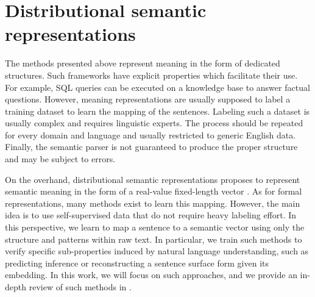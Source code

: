 \section{Distributional semantic representations}

The methods presented above represent meaning in the form of dedicated structures. Such frameworks have explicit properties which facilitate their use. For example, SQL queries can be executed on a knowledge base to answer factual questions. However, meaning representations are usually supposed to label a training dataset to learn the mapping of the sentences. Labeling such a dataset is usually complex and requires linguistic experts. The process should be repeated for every domain and language and usually restricted to generic English data. Finally, the semantic parser is not guaranteed to produce the proper structure and may be subject to errors.

On the overhand, distributional semantic representations proposes to represent semantic meaning in the form of a real-value fixed-length vector \textcite{jurafsky_2009}. As for formal representations, many methods exist to learn this mapping. However, the main idea is to use self-supervised data that do not require heavy labeling effort. In this perspective, we learn to map a sentence to a semantic vector using only the structure and patterns within raw text. In particular, we train such methods to verify specific sub-properties induced by natural language understanding, such as predicting inference or reconstructing a sentence surface form given its embedding. In this work, we will focus on such approaches, and we provide an in-depth review of such methods in .



